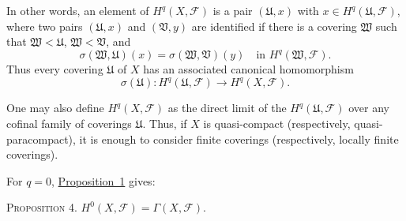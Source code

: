 In other words, an element of $H^q(X,\mathcal{F})$ is a pair $(\mathfrak{U},x)$ with $x\in H^q(\mathfrak{U},\mathcal{F})$, where two pairs $(\mathfrak{U},x)$ and $(\mathfrak{V},y)$ are identified if there is a covering $\mathfrak{W}$ such that $\mathfrak{W}<\mathfrak{U}$, $\mathfrak{W}<\mathfrak{V}$, and
\[
\sigma(\mathfrak{W},\mathfrak{U})(x)
=\sigma(\mathfrak{W},\mathfrak{V})(y)
\quad\text{in }H^q(\mathfrak{W},\mathcal{F}).
\]
Thus every covering $\mathfrak{U}$ of $X$ has an associated canonical homomorphism
\[
\sigma(\mathfrak{U}):
H^q(\mathfrak{U},\mathcal{F})\longrightarrow H^q(X,\mathcal{F}).
\]

One may also define $H^q(X,\mathcal{F})$ as the direct limit of the $H^q(\mathfrak{U},\mathcal{F})$ over any cofinal family of coverings $\mathfrak{U}$. Thus, if $X$ is quasi-compact (respectively, quasi-paracompact), it is enough to consider finite coverings (respectively, locally finite coverings).

For $q=0$, \hyperref[fac:I:3:no:20:prop:1]{Proposition~1} gives:

\label{fac:I:3:no:22:prop:4}
\textsc{Proposition 4.} $H^0(X,\mathcal{F})=\Gamma(X,\mathcal{F})$.
